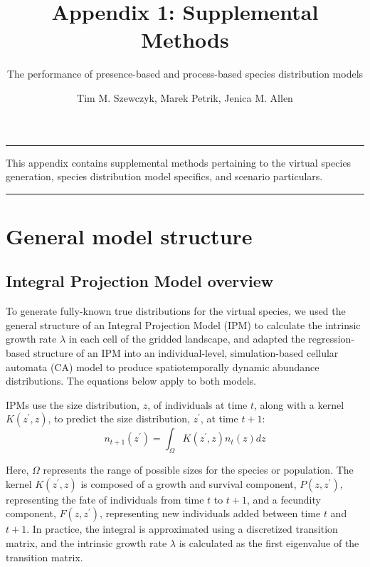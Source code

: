 \documentclass[]{article}
\title{Appendix 1: Supplemental Methods}
\subtitle{The performance of presence-based and process-based species distribution
models}
\author{Tim M. Szewczyk, Marek Petrik, Jenica M. Allen}
\date{}
\begin{document}
\maketitle

{
\setcounter{tocdepth}{1}
\tableofcontents
}
\setcounter{table}{0}  \renewcommand{\thetable}{A.\arabic{table}} \setcounter{figure}{0} \renewcommand{\thefigure}{A.\arabic{figure}}

\begin{center}\rule{0.5\linewidth}{\linethickness}\end{center}

This appendix contains supplemental methods pertaining to the virtual
species generation, species distribution model specifics, and scenario
particulars.

\begin{center}\rule{0.5\linewidth}{\linethickness}\end{center}

\section{General model structure}
\subsection{Integral Projection Model overview}

To generate fully-known true distributions for the virtual species, we
used the general structure of an Integral Projection Model (IPM) to
calculate the intrinsic growth rate \(\lambda\) in each cell of the
gridded landscape, and adapted the regression-based structure of an IPM
into an individual-level, simulation-based cellular automata (CA) model
to produce spatiotemporally dynamic abundance distributions. The
equations below apply to both models.

IPMs use the size distribution, \(z\), of individuals at time \(t\),
along with a kernel \(K(z^{\prime}, z)\), to predict the size
distribution, \(z^{\prime}\), at time \(t+1\): \begin{equation}
n_{t+1}(z^{\prime}) = \int_{\Omega} K(z^{\prime}, z) n_t(z) dz
\end{equation}

Here, \(\Omega\) represents the range of possible sizes for the species
or population. The kernel \(K(z^{\prime}, z)\) is composed of a growth
and survival component, \(P(z, z^{\prime})\), representing the fate of
individuals from time \(t\) to \(t+1\), and a fecundity component,
\(F(z, z^{\prime})\), representing new individuals added between time
\(t\) and \(t+1\). In practice, the integral is approximated using a
discretized transition matrix, and the intrinsic growth rate \(\lambda\)
is calculated as the first eigenvalue of the transition matrix.
\end{document}
